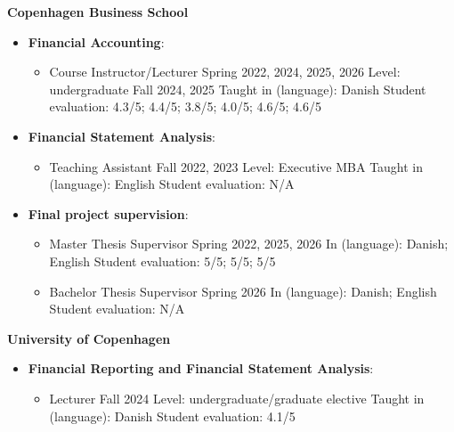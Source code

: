\documentclass[letterpaper,9pt]{extarticle}
\begin{document}
\noindent\textbf{Copenhagen Business School}
\begin{itemize}

    \item \textbf{Financial Accounting}:
    \begin{itemize} 
        \item Course Instructor/Lecturer \hfill Spring 2022, 2024, 2025, 2026 \newline
        \indent Level: undergraduate \hfill Fall 2024, 2025 \newline
        \indent Taught in (language): Danish \newline 
        \indent Student evaluation: 4.3/5; 4.4/5; 3.8/5; 4.0/5; 4.6/5; 4.6/5   
    \end{itemize}

    \item \textbf{Financial Statement Analysis}:
    \begin{itemize} 
        \item Teaching Assistant \hfill Fall 2022, 2023 \newline
        \indent Level: Executive MBA \newline
        \indent Taught in (language): English \newline 
        \indent Student evaluation: N/A  
    \end{itemize}

    \item \textbf{Final project supervision}:
    \begin{itemize} 
        \item Master Thesis Supervisor \hfill Spring 2022, 2025, 2026 \newline
        \indent In (language): Danish; English \newline 
        \indent Student evaluation: 5/5; 5/5; 5/5  
        \item Bachelor Thesis Supervisor \hfill Spring 2026 \newline
        \indent In (language): Danish; English \newline 
        \indent Student evaluation: N/A
    \end{itemize}
\end{itemize}

\noindent\textbf{University of Copenhagen}
\begin{itemize}

    \item \textbf{Financial Reporting and Financial Statement Analysis}:
    \begin{itemize} 
        \item Lecturer \hfill Fall 2024  \newline
        \indent Level: undergraduate/graduate elective \newline
        \indent Taught in (language): Danish \newline 
        \indent Student evaluation: 4.1/5   
    \end{itemize}
\end{itemize}
\end{document}
